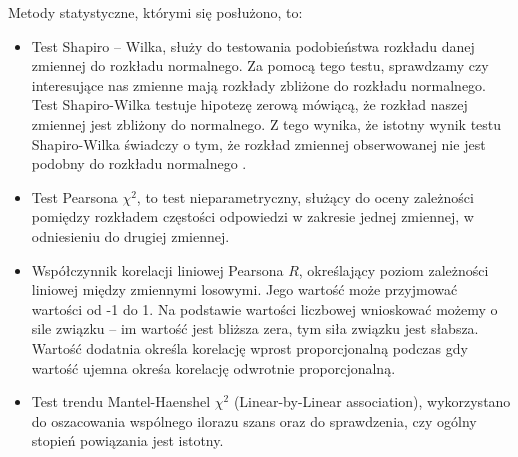 \documentclass[a4paper,12pt,twoside,openright]{mwrep}
\begin{document}
Metody statystyczne, którymi się posłużono, to:
\begin{itemize}
     \item Test Shapiro – Wilka, służy do testowania podobieństwa rozkładu danej zmiennej do rozkładu normalnego. Za pomocą tego testu, sprawdzamy czy interesujące nas zmienne mają rozkłady zbliżone do rozkładu normalnego. Test Shapiro-Wilka testuje hipotezę zerową mówiącą, że rozkład naszej zmiennej jest zbliżony do normalnego. Z tego wynika, że istotny wynik testu Shapiro-Wilka świadczy o tym, że rozkład zmiennej obserwowanej nie jest podobny do rozkładu normalnego \cite{ShapWilk}. 
    
     \item Test Pearsona $\chi^2$, to test nieparametryczny, służący do oceny zależności pomiędzy rozkładem częstości odpowiedzi w zakresie jednej zmiennej, w odniesieniu do drugiej zmiennej.
     
     \item Współczynnik korelacji liniowej Pearsona $R$, określający poziom zależności liniowej między zmiennymi losowymi. Jego wartość może przyjmować wartości od -1 do 1. Na podstawie wartości liczbowej wnioskować możemy o sile związku – im wartość jest bliższa zera, tym siła związku jest słabsza. Wartość dodatnia określa korelację wprost proporcjonalną podczas gdy wartość ujemna okreśa korelację odwrotnie proporcjonalną.
     
     \item Test trendu Mantel-Haenshel $\chi^2$ (Linear-by-Linear association)\cite{mantel}, wykorzystano do oszacowania wspólnego ilorazu szans oraz do sprawdzenia, czy ogólny stopień powiązania jest istotny.
     
%    
     
\end{itemize}
\end{document}
